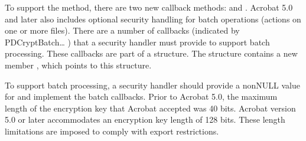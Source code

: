 \documentclass[letterpaper,12pt,english,openany,oneside]{sphinxmanual}
\begin{document}
To support the  method, there are two new callback methods:  and . Acrobat 5.0 and later also includes optional security handling for batch operations (actions on one or more files). There are a number of callbacks (indicated by PDCryptBatch… ) that a security handler must provide to support batch processing. These callbacks are part of a  structure. The  structure contains a new member , which points to this structure.

To support batch processing, a security handler should provide a non\sphinxhyphen{}NULL value for  and implement the batch callbacks. Prior to Acrobat 5.0, the maximum length of the encryption key that Acrobat accepted was 40 bits. Acrobat version 5.0 or later accommodates an encryption key length of 128 bits. These length limitations are imposed to comply with export restrictions.
\end{document}
